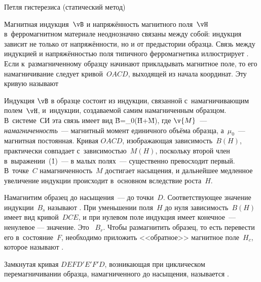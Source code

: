 {Петля гистерезиса (статический метод)}




Магнитная индукция~$\vB$ и напряжённость магнитного поля~$\vH$ в~ферромагнитном материале неоднозначно связаны между
собой: индукция зависит не только от напряжённости, но и от предыстории образца. Связь между индукцией и напряжённостью
поля типичного ферромагнетика иллюстрирует . Если к~размагниченному образцу начинают прикладывать магнитное поле,
то его намагничивание следует кривой~$OACD$, выходящей из начала координат. Эту кривую называют 

Индукция $\vB$ в образце состоит из индукции, связанной с~намагничивающим полем~$\vH$, и~индукции, создаваемой самим
намагниченным образцом. В~системе~СИ эта связь имеет вид
\v{B}=\mu_0(\v{H}+\v{M}),
\ee
где $\v{M}$~--- \emph{намагниченность}~--- магнитный момент единичного объёма образца, а~$\mu_0$~--- магнитная
постоянная. Кривая $OACD$, изображающая зависимость~$B(H)$, практически совпадает с~зависимостью~$M(H)$, поскольку
второй член в~выражении~(\r{1})~--- в малых полях~--- существенно превосходит первый. В~точке~$C$ намагниченность~$M$
достигает насыщения, и дальнейшее медленное увеличение индукции происходит в~основном вследствие роста~$H$.

Намагнитим образец до насыщения~--- до точки~$D$. Соответствующее значение индукции~$B_s$ называют . При уменьшении поля~$H$ до нуля зависимость~$B(H)$ имеет вид кривой~$DCE$, и при нулевом поле индукция имеет
конечное~--- ненулевое --- значение. Это ~$B_r$. Чтобы размагнитить образец, то есть перевести
его в~состояние~$F$, необходимо приложить <<обратное>> магнитное поле~$H_c$, которое называют .

Замкнутая кривая $DEFD'E'F'D$, возникающая при циклическом перемагничивании образца, намагниченного до насыщения,
называется .

